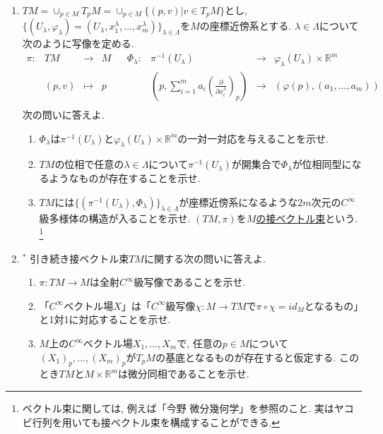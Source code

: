 \documentclass[dvipdfmx,a4paper,11pt]{article}
\newcommand{\R}{\mathbb{R}}
\theoremstyle{definition}
\newcommand{\pdrv}[2]{\frac{\partial #1}{\partial #2}}
\begin{document}
\begin{enumerate}[label=\textbf{問}2.\arabic*]
\item \label{tm_const } $TM = \cup_{p \in M}T_{p}M = \cup_{p \in M}\{ (p,v) | v \in T_{p}M\}$とし, $\{ (U_{\lambda}, \varphi_{\lambda})=(U_{\lambda}, x_{1}^{\lambda}, \ldots, x_{m}^{\lambda})\}_{\lambda \in \Lambda}$を$M$の座標近傍系とする. $\lambda \in \Lambda$について次のように写像を定める.
$$
\begin{matrix}
\pi :& TM &\rightarrow& M& &\Phi_{\lambda} :& \pi^{-1}(U_{\lambda})& \rightarrow& \varphi_{\lambda}(U_{\lambda}) \times \R^{m} \\
	& (p,v) &\mapsto& p& &					& (p, \sum_{i=1}^{m} a_{i} \left(\pdrv{}{x_{i}^{\lambda}}\right)_p)& \rightarrow& (\varphi(p), (a_1, \ldots, a_{m})) \\
\end{matrix}
$$
次の問いに答えよ. 

\begin{enumerate}
\item $\Phi_{\lambda}$は$\pi^{-1}(U_{\lambda})$と$\varphi_{\lambda}(U_{\lambda}) \times \R^{m} $の一対一対応を与えることを示せ.
\item $TM$の位相で任意の$\lambda \in \Lambda$について$\pi^{-1}(U_{\lambda})$が開集合で$\Phi_{\lambda}$が位相同型になるようなものが存在することを示せ.
\item $TM$には$\{( \pi^{-1}(U_{\lambda}), \Phi_{\lambda} )\}_{\lambda \in \Lambda}$が座標近傍系になるような$2m$次元の$C^{\infty}$級多様体の構造が入ることを示せ. $(TM, \pi)$を\underline{$M$の接ベクトル束}という. \footnote{ベクトル束に関しては, 例えば「今野 微分幾何学」を参照のこと. 実はヤコビ行列を用いても接ベクトル束を構成することができる. }
\end{enumerate}

\item \label{tm_vector} $^{*}$ 引き続き接ベクトル束$TM$に関する次の問いに答えよ.
\begin{enumerate}
\item $\pi : TM \rightarrow M$は全射$C^{\infty}$級写像であることを示せ. 
\item 「$C^{\infty}$ベクトル場$X$」は「$C^{\infty}$級写像$\chi : M \rightarrow TM$で$\pi \circ \chi = id_{M}$となるもの」と1対1に対応することを示せ.
\item $M$上の$C^{\infty}$ベクトル場$X_1, \ldots, X_{m}$で, 任意の$p \in M$について$(X_1)_{p}, \ldots, (X_{m})_{p}$が$T_{p}M$の基底となるものが存在すると仮定する. このとき$TM $と$M \times \R^{m}$は微分同相であることを示せ.  
\end{enumerate}


\end{enumerate}
\end{document}
